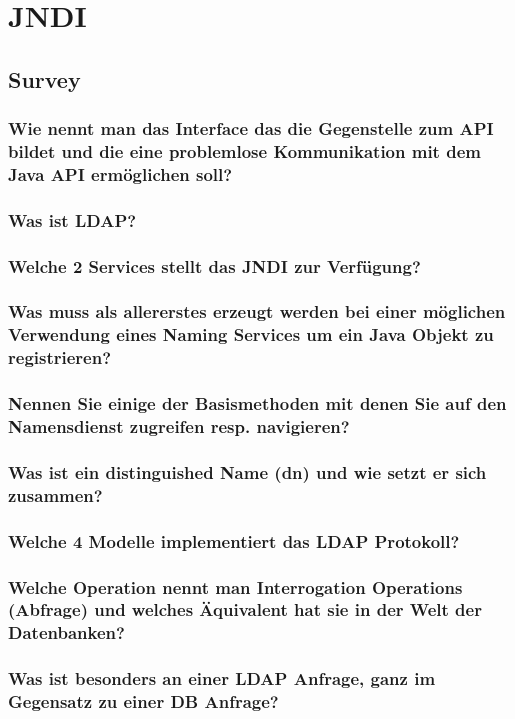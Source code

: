\chapter{JNDI}


\section{Survey}

\subsection{Wie nennt man das Interface das die Gegenstelle zum API bildet und die eine problemlose Kommunikation mit dem Java API ermöglichen soll?}

\subsection{Was ist LDAP?}

\subsection{Welche 2 Services stellt das JNDI zur Verfügung?}

\subsection{Was muss als allererstes erzeugt werden bei einer möglichen Verwendung eines Naming Services um ein Java Objekt zu registrieren?}

\subsection{Nennen Sie einige der Basismethoden mit denen Sie auf den Namensdienst zugreifen resp. navigieren?}

\subsection{Was ist ein distinguished Name (dn) und wie setzt er sich zusammen?}

\subsection{Welche 4 Modelle implementiert das LDAP Protokoll?}

\subsection{Welche Operation nennt man Interrogation Operations (Abfrage) und welches Äquivalent hat sie in der Welt der Datenbanken?}

\subsection{Was ist besonders an einer LDAP Anfrage, ganz im Gegensatz zu einer DB Anfrage?}